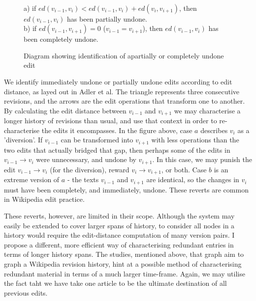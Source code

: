 \documentclass[a4paper,11pt,twoside,notitlepage]{article}
\begin{document}
        \begin{figure}[H]
          \centering
          \\
          a) if $ed(v_{i-1},v_i) < ed(v_{i-1},v_i) +
          ed(v_{i},v_{i+1})$, then $ed(v_{i-1},v_i)$ has been
          partially undone.\\ b) if $ed(v_{i-1},v_{i+1}) = 0$
          ($v_{i-1} = v_{i+1}$), then $ed(v_{i-1},v_i)$ has been
          completely undone.
          \caption{Diagram showing identification of apartially or
            completely undone edit}
          \label{fig:undo}
        \end{figure}

        We identify immediately undone or partially undone edits
        according to edit distance, as layed out in Adler et
        al\cite{Adler2007}. The triangle represents three consecutive
        revisions, and the arrows are the edit operations that
        transform one to another. By calculating the edit distance
        between $v_{i-1}$ and $v_{i+1}$ we may characterise a longer
        history of revisions than usual, and use that context in order
        to re-characterise the edits it encompasses. In the figure
        above, case $a$ describes $v_i$ as a 'diversion'. If $v_{i-1}$
        can be transformed into $v_{i+1}$ with less operations than
        the two edits that actually bridged that gap, then perhaps
        some of the edits in $v_{i-1} \rightarrow v_i$ were
        unnecessary, and undone by $v_{i+1}$. In this case, we may
          punish the edit $v_{i-1} \rightarrow v_i$ (for the
          diversion), reward $v_{i} \rightarrow v_{i+1}$, or
          both. Case $b$ is an extreme version of $a$ - the texts
          $v_{i-1}$ and $v_{i+1}$ are identical, so the changes in
            $v_i$ must have been completely, and immediately,
            undone. These reverts are common in Wikipedia edit
            practice.\cite{wiki-revert}

        These reverts, however, are limited in their scope. Although
        the system may easily be extended to cover larger spans of
        history, to consider all nodes in a history would require the
        edit-distance computation of many version pairs. I propose a
        different, more efficient way of characterising redundant
        entries in terms of longer history spans. The studies, mentioned
        above, that graph aim to graph a Wikipedia revision history,
        hint at a possible method of characterising redundant material
        in terms of a much larger time-frame. Again, we may utilise
        the fact taht we have take one article to be the ultimate
        destination of all previous edits. 
\end{document}
